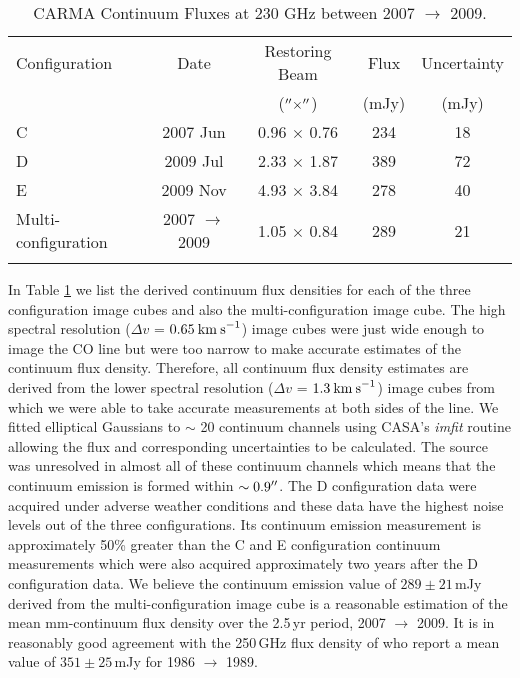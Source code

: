 \begin{table}[!hbt]
\begin{center}
\caption[CARMA Continuum Fluxes at 230 GHz]
{CARMA Continuum Fluxes at 230 GHz between 2007 $\rightarrow$ 2009.}
\begin{tabular}{lcccc}
\hline
\hline
\rule{0pt}{2.5ex}Configuration & Date &Restoring Beam & Flux & Uncertainty \\
 &  & ($^{\prime\prime} \times ^{\prime\prime}$) &(mJy) & (mJy) \\
\hline
\rule{0pt}{2.5ex}C & 2007 Jun&0.96 $\times$ 0.76 & 234 & 18\\
D & 2009 Jul&2.33 $\times$ 1.87 & 389 & 72\\
E & 2009 Nov&4.93 $\times$ 3.84 & 278 & 40 \\
Multi-configuration &2007 $\rightarrow$ 2009 &1.05 $\times$ 0.84 & 289 & 21\\
\hline
\rule{0pt}{2.0ex}
\end{tabular}
\label{tab:5.1}
\end{center}
\end{table}
\vspace{-0.5cm}
In Table \ref{tab:5.1} we list the derived continuum flux densities for each of the three configuration image cubes and also the multi-configuration image cube. The high spectral resolution ($\Delta v$ = $0.65\>{\rm km\>s}^{-1}$) image cubes were just wide enough to image the CO line but were too narrow to make accurate estimates of the continuum flux density. Therefore, all continuum flux density estimates are derived from the lower spectral resolution ($\Delta v$ = $1.3\>{\rm km\>s}^{-1}$) image cubes from which we were able to take accurate measurements at both sides of the line. We fitted elliptical Gaussians to $\sim$ 20 continuum channels using CASA's \textit{imfit} routine allowing the flux and corresponding uncertainties to be calculated. The source was unresolved in almost all of these continuum channels which means that the continuum emission is formed within $\sim 0.9^{\prime\prime}$. The D configuration data were acquired under adverse weather conditions and these data have the highest noise levels out of the three configurations. Its continuum emission measurement is approximately 50\% greater than the C and E configuration continuum measurements which were also acquired approximately two years after the D configuration data.  We believe the continuum emission value of $289 \pm 21$\,mJy derived from the multi-configuration image cube is a reasonable estimation of the mean mm-continuum flux density over the 2.5\,yr period, 2007 $\rightarrow$ 2009. It is in reasonably good agreement with the 250\,GHz flux density of \cite{altenhoff_1994} who report a mean value of $351 \pm 25$\,mJy for 1986 $\rightarrow$ 1989.


